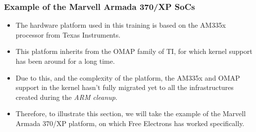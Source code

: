 \begin{frame}
  \frametitle{Example of the Marvell Armada 370/XP SoCs}
  \begin{itemize}
  \item The hardware platform used in this training is based on the
    AM335x processor from Texas Instruments.
  \item This platform inherits from the OMAP family of TI, for which
    kernel support has been around for a long time.
  \item Due to this, and the complexity of the platform, the AM335x
    and OMAP support in the kernel hasn't fully migrated yet to all
    the infrastructures created during the {\em ARM cleanup}.
  \item Therefore, to illustrate this section, we will take the
    example of the Marvell Armada 370/XP platform, on which Free
    Electrons has worked specifically.
  \end{itemize}
\end{frame}

